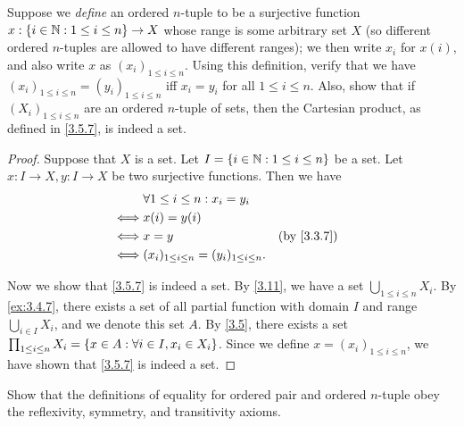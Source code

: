 \begin{ex}\label{ex:3.5.2}
	Suppose we \emph{define} an ordered \(n\)-tuple to be a surjective function \(x : \left\lbrace i \in \mathbb{N} : 1 \leq i \leq n\right\rbrace \to X\) whose range is some arbitrary set \(X\) (so different ordered \(n\)-tuples are allowed to have different ranges);
	we then write \(x_i\) for \(x(i)\), and also write \(x\) as \((x_i)_{1 \leq i \leq n}\).
	Using this definition, verify that we have \((x_i)_{1 \leq i \leq n} = (y_i)_{1 \leq i \leq n}\) iff \(x_i = y_i\) for all \(1 \leq i \leq n\).
	Also, show that if \((X_i)_{1 \leq i \leq n}\) are an ordered \(n\)-tuple of sets, then the Cartesian product, as defined in \cref{3.5.7}, is indeed a set.
\end{ex}

\begin{proof}
	Suppose that \(X\) is a set.
	Let \(I = \left\lbrace i \in \mathbb{N} : 1 \leq i \leq n\right\rbrace\) be a set.
	Let \(x : I \to X, y : I \to X\) be two surjective functions.
	Then we have
	\begin{align*}
		     & \forall 1 \leq i \leq n : x_i = y_i                                \\
		\iff & x(i) = y(i)                                                        \\
		\iff & x = y                                              &  & \by{3.3.7} \\
		\iff & (x_i)_{1 \leq i \leq n} = (y_i)_{1 \leq i \leq n}.
	\end{align*}

	Now we show that \cref{3.5.7} is indeed a set.
	By \cref{3.11}, we have a set \(\bigcup_{1 \leq i \leq n} X_i\).
	By \cref{ex:3.4.7}, there exists a set of all partial function with domain \(I\) and range \(\bigcup_{i \in I} X_i\), and we denote this set \(A\).
	By \cref{3.5}, there exists a set \(\prod_{1 \leq i \leq n} X_i = \left\lbrace x \in A : \forall i \in I, x_i \in X_i\right\rbrace\).
	Since we define \(x = (x_i)_{1 \leq i \leq n}\), we have shown that \cref{3.5.7} is indeed a set.
\end{proof}

\begin{ex}\label{ex:3.5.3}
	Show that the definitions of equality for ordered pair and ordered \(n\)-tuple obey the reflexivity, symmetry, and transitivity axioms.
\end{ex}

